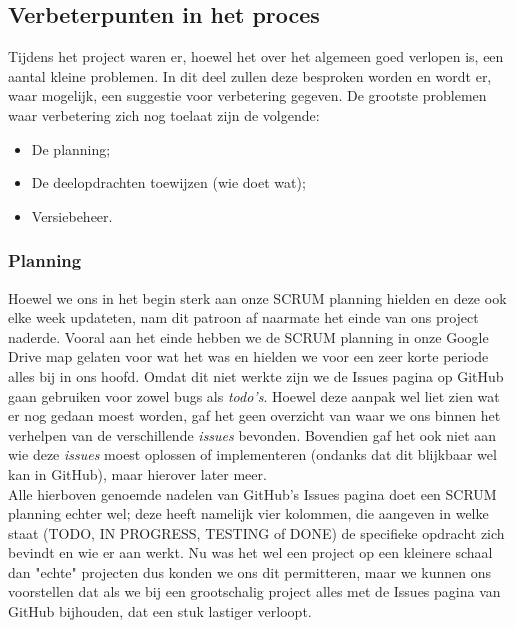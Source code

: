 \documentclass[a4paper,11pt]{article}
\begin{document}
\subsection{Verbeterpunten in het proces}
Tijdens het project waren er, hoewel het over het algemeen goed verlopen is, een aantal kleine problemen. In dit deel zullen deze besproken worden en wordt er, waar mogelijk, een suggestie voor verbetering gegeven. De grootste problemen waar verbetering zich nog toelaat zijn de volgende:
\begin{itemize}
	\item De planning;
	\item De deelopdrachten toewijzen (wie doet wat);
	\item Versiebeheer.
\end{itemize}

\subsubsection{Planning}
Hoewel we ons in het begin sterk aan onze SCRUM planning hielden en deze ook elke week updateten, nam dit patroon af naarmate het einde van ons project naderde. Vooral aan het einde hebben we de SCRUM planning in onze Google Drive map gelaten voor wat het was en hielden we voor een zeer korte periode alles bij in ons hoofd. Omdat dit niet werkte zijn we de Issues pagina op GitHub gaan gebruiken voor zowel bugs als \textit{todo's}. Hoewel deze aanpak wel liet zien wat er nog gedaan moest worden, gaf het geen overzicht van waar we ons binnen het verhelpen van de verschillende \textit{issues} bevonden. Bovendien gaf het ook niet aan wie deze \textit{issues} moest oplossen of implementeren (ondanks dat dit blijkbaar wel kan in GitHub), maar hierover later meer.\\

Alle hierboven genoemde nadelen van GitHub's Issues pagina doet een SCRUM planning echter wel; deze heeft namelijk vier kolommen, die aangeven in welke staat (TODO, IN PROGRESS, TESTING of DONE) de specifieke opdracht zich bevindt en wie er aan werkt. Nu was het wel een project op een kleinere schaal dan "echte" projecten dus konden we ons dit permitteren, maar we kunnen ons voorstellen dat als we bij een grootschalig project alles met de Issues pagina van GitHub bijhouden, dat een stuk lastiger verloopt.
\end{document}

